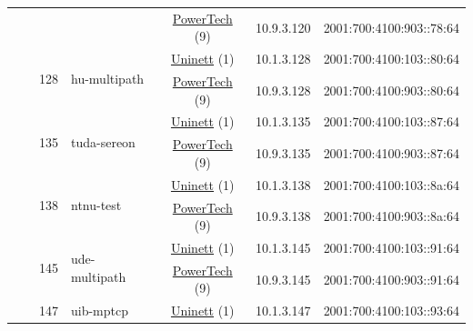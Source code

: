 \begin{small}
\begin{center}
\begin{longtable}{|c|c|c|c|c|c|c|c|}
  &  &  &  & \multicolumn{2}{|c|}{\tiny{\href{http://www.powertech.no}{PowerTech} (9)}} & \tiny{10.9.3.120} & \tiny{2001:700:4100:903::78:64} \\* \cline{3-3}\cline{4-4}\cline{5-5}\cline{6-6}\cline{7-7}\cline{8-8}
  &  & \multirow{2}{*}{\tiny{128}} & \multicolumn{1}{|l|}{\multirow{2}{*}{\tiny{hu-multipath}}} & \multicolumn{2}{|c|}{\tiny{\href{https://www.uninett.no}{Uninett} (1)}} & \tiny{10.1.3.128} & \tiny{2001:700:4100:103::80:64} \\* \cline{5-5}\cline{6-6}\cline{7-7}\cline{8-8}
  &  &  &  & \multicolumn{2}{|c|}{\tiny{\href{http://www.powertech.no}{PowerTech} (9)}} & \tiny{10.9.3.128} & \tiny{2001:700:4100:903::80:64} \\* \cline{3-3}\cline{4-4}\cline{5-5}\cline{6-6}\cline{7-7}\cline{8-8}
  &  & \multirow{2}{*}{\tiny{135}} & \multicolumn{1}{|l|}{\multirow{2}{*}{\tiny{tuda-sereon}}} & \multicolumn{2}{|c|}{\tiny{\href{https://www.uninett.no}{Uninett} (1)}} & \tiny{10.1.3.135} & \tiny{2001:700:4100:103::87:64} \\* \cline{5-5}\cline{6-6}\cline{7-7}\cline{8-8}
  &  &  &  & \multicolumn{2}{|c|}{\tiny{\href{http://www.powertech.no}{PowerTech} (9)}} & \tiny{10.9.3.135} & \tiny{2001:700:4100:903::87:64} \\* \cline{3-3}\cline{4-4}\cline{5-5}\cline{6-6}\cline{7-7}\cline{8-8}
  &  & \multirow{2}{*}{\tiny{138}} & \multicolumn{1}{|l|}{\multirow{2}{*}{\tiny{ntnu-test}}} & \multicolumn{2}{|c|}{\tiny{\href{https://www.uninett.no}{Uninett} (1)}} & \tiny{10.1.3.138} & \tiny{2001:700:4100:103::8a:64} \\* \cline{5-5}\cline{6-6}\cline{7-7}\cline{8-8}
  &  &  &  & \multicolumn{2}{|c|}{\tiny{\href{http://www.powertech.no}{PowerTech} (9)}} & \tiny{10.9.3.138} & \tiny{2001:700:4100:903::8a:64} \\* \cline{3-3}\cline{4-4}\cline{5-5}\cline{6-6}\cline{7-7}\cline{8-8}
  &  & \multirow{2}{*}{\tiny{145}} & \multicolumn{1}{|l|}{\multirow{2}{*}{\tiny{ude-multipath}}} & \multicolumn{2}{|c|}{\tiny{\href{https://www.uninett.no}{Uninett} (1)}} & \tiny{10.1.3.145} & \tiny{2001:700:4100:103::91:64} \\* \cline{5-5}\cline{6-6}\cline{7-7}\cline{8-8}
  &  &  &  & \multicolumn{2}{|c|}{\tiny{\href{http://www.powertech.no}{PowerTech} (9)}} & \tiny{10.9.3.145} & \tiny{2001:700:4100:903::91:64} \\* \cline{3-3}\cline{4-4}\cline{5-5}\cline{6-6}\cline{7-7}\cline{8-8}
  &  & \multirow{2}{*}{\tiny{147}} & \multicolumn{1}{|l|}{\multirow{2}{*}{\tiny{uib-mptcp}}} & \multicolumn{2}{|c|}{\tiny{\href{https://www.uninett.no}{Uninett} (1)}} & \tiny{10.1.3.147} & \tiny{2001:700:4100:103::93:64} \\* \cline{5-5}\cline{6-6}\cline{7-7}\cline{8-8}

\end{longtable}
\end{center}
\end{small}

